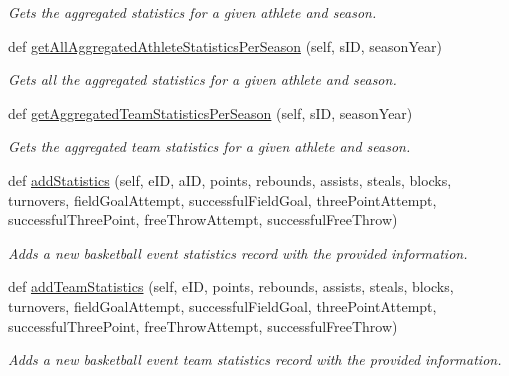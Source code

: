\begin{DoxyCompactItemize}
\begin{DoxyCompactList}\small\item\em Gets the aggregated statistics for a given athlete and season. \end{DoxyCompactList}\item 
def \hyperlink{classhandler_1_1dao_1_1basketball__event__dao_1_1_basketball_event_d_a_o_a1e711ea382e54616539aa2249f4c5f75}{get\+All\+Aggregated\+Athlete\+Statistics\+Per\+Season} (self, s\+ID, season\+Year)
\begin{DoxyCompactList}\small\item\em Gets all the aggregated statistics for a given athlete and season. \end{DoxyCompactList}\item 
def \hyperlink{classhandler_1_1dao_1_1basketball__event__dao_1_1_basketball_event_d_a_o_afc64d2c7c96fc004730856339137eec7}{get\+Aggregated\+Team\+Statistics\+Per\+Season} (self, s\+ID, season\+Year)
\begin{DoxyCompactList}\small\item\em Gets the aggregated team statistics for a given athlete and season. \end{DoxyCompactList}\item 
def \hyperlink{classhandler_1_1dao_1_1basketball__event__dao_1_1_basketball_event_d_a_o_a4027db3b1ac7c6d17dd12d015008f72a}{add\+Statistics} (self, e\+ID, a\+ID, points, rebounds, assists, steals, blocks, turnovers, field\+Goal\+Attempt, successful\+Field\+Goal, three\+Point\+Attempt, successful\+Three\+Point, free\+Throw\+Attempt, successful\+Free\+Throw)
\begin{DoxyCompactList}\small\item\em Adds a new basketball event statistics record with the provided information. \end{DoxyCompactList}\item 
def \hyperlink{classhandler_1_1dao_1_1basketball__event__dao_1_1_basketball_event_d_a_o_aa2b00cf16db9ae95bfd522764d3cbf85}{add\+Team\+Statistics} (self, e\+ID, points, rebounds, assists, steals, blocks, turnovers, field\+Goal\+Attempt, successful\+Field\+Goal, three\+Point\+Attempt, successful\+Three\+Point, free\+Throw\+Attempt, successful\+Free\+Throw)
\begin{DoxyCompactList}\small\item\em Adds a new basketball event team statistics record with the provided information. \end{DoxyCompactList}\item 

\end{DoxyCompactItemize}
